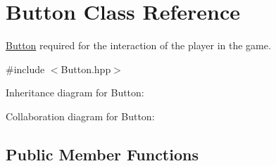 \hypertarget{class_button}{\section{Button Class Reference}
\label{class_button}
}


\hyperlink{class_button}{Button} required for the interaction of the player in the game.  




{\ttfamily \#include $<$Button.\+hpp$>$}



Inheritance diagram for Button\+:


Collaboration diagram for Button\+:
\subsection*{Public Member Functions}
